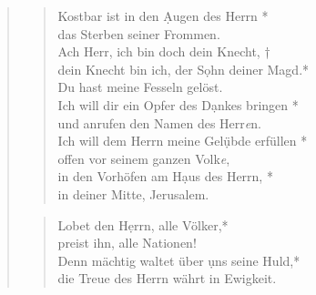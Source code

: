\begin{quote}
\begin{verse}
Kostbar ist in den \d Augen des Herrn *\\ 
das Sterben seiner Frommen.\\ 
\vin Ach Herr, ich bin doch dein Knecht, †\\ 
\vin dein Knecht bin ich, der S\d ohn deiner Magd.*\\ 
\vin Du hast meine Fesseln gelöst.\\ 
Ich will dir ein Opfer des D\d ankes bringen *\\ 
und anrufen den Namen des Herr\textit{e}n.\\ 
\vin Ich will dem Herrn meine Gel\d übde erfüllen *\\ 
\vin offen vor seinem ganzen Volk\textit{e}, \\
in den Vorhöfen am H\d aus des Herrn, *\\ 
in deiner Mitte, Jerusalem.\\ 

\end{verse}

\vspace{0.5cm}


\begin{verse}
 Lobet den H\d errn, alle Völker,*\\
preist ihn, alle Nationen! \\
\vin Denn mächtig waltet über \d uns seine Huld,*\\
\vin die Treue des Herrn währt in Ewigkeit. \\
\end{verse}

\end{quote}

\vspace{0.5cm}

\def\greinitialformat#1{{\fontsize{40}{40}\selectfont #1}}
\gresetfirstlineaboveinitial{\small \textcolor{red}{Ps 137}}{}
\setaboveinitialseparation{0.72mm}

\vspace{0.5cm}


